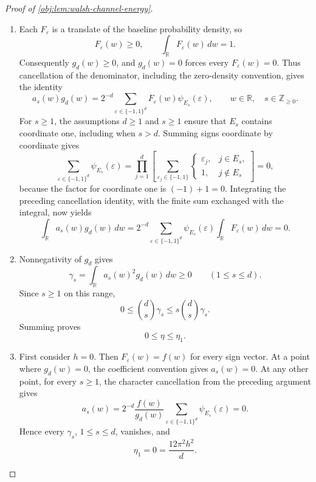 \begin{proof}[Proof of \cref{obj:lem:walsh-channel-energy}]
\begin{enumerate}
\item Each \(F_\varepsilon\) is a translate of the baseline probability density, so
\[
F_\varepsilon(w)\ge0,
\qquad
\int_{\mathbb R}F_\varepsilon(w)\,dw=1.
\]
Consequently \(g_d(w)\ge0\), and \(g_d(w)=0\) forces every \(F_\varepsilon(w)=0\). Thus cancellation of the denominator, including the zero-density convention, gives the identity
\[
a_s(w)g_d(w)
=
2^{-d}\sum_{\varepsilon\in\{-1,1\}^d}
F_\varepsilon(w)\psi_{E_s}(\varepsilon),
\qquad w\in\mathbb R,\quad s\in\mathbb Z_{\ge0}.
\]
For \(s\ge1\), the assumptions \(d\ge1\) and \(s\ge1\) ensure that \(E_s\) contains coordinate one, including when \(s>d\). Summing signs coordinate by coordinate gives
\[
\sum_{\varepsilon\in\{-1,1\}^d}\psi_{E_s}(\varepsilon)
=
\prod_{j=1}^d
\left[
\sum_{\varepsilon_j\in\{-1,1\}}
\begin{cases}
\varepsilon_j,&j\in E_s,\\
1,&j\notin E_s
\end{cases}
\right]
=0,
\]
because the factor for coordinate one is \((-1)+1=0\). Integrating the preceding cancellation identity, with the finite sum exchanged with the integral, now yields
\[
\int_{\mathbb R}a_s(w)g_d(w)\,dw
=
2^{-d}\sum_{\varepsilon\in\{-1,1\}^d}
\psi_{E_s}(\varepsilon)
\int_{\mathbb R}F_\varepsilon(w)\,dw
=0.
\]

\item Nonnegativity of \(g_d\) gives
\[
\gamma_s=\int_{\mathbb R}a_s(w)^2g_d(w)\,dw\ge0
\qquad(1\le s\le d).
\]
Since \(s\ge1\) on this range,
\[
0\le \binom ds\gamma_s
\le s\binom ds\gamma_s.
\]
Summing proves
\[
0\le\eta\le\eta_1.
\]

\item First consider \(h=0\). Then \(F_\varepsilon(w)=f(w)\) for every sign vector. At a point where \(g_d(w)=0\), the coefficient convention gives \(a_s(w)=0\). At any other point, for every \(s\ge1\), the character cancellation from the preceding argument gives
\[
a_s(w)
=
2^{-d}\frac{f(w)}{g_d(w)}
\sum_{\varepsilon\in\{-1,1\}^d}\psi_{E_s}(\varepsilon)
=0.
\]
Hence every \(\gamma_s\), \(1\le s\le d\), vanishes, and
\[
\eta_1=0=\frac{12\pi^2h^2}{d}.
\]


\end{enumerate}
\end{proof}

